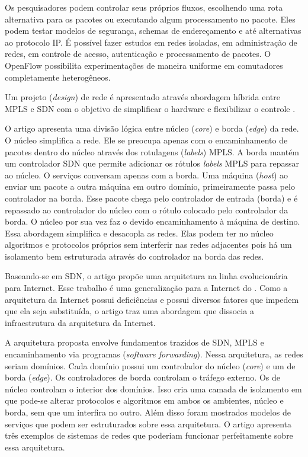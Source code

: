 Os pesquisadores podem controlar seus próprios fluxos, escolhendo uma rota
alternativa para os pacotes ou executando algum processamento no pacote.
Eles podem testar modelos de segurança, schemas de endereçamento e até
alternativas ao protocolo IP.
É possível fazer estudos em redes isoladas, em administração de redes,
em controle de acesso, autenticação e processamento de pacotes.
O OpenFlow possibilita experimentações de maneira uniforme em comutadores
completamente heterogêneos.

Um projeto (\emph{design}) de rede é apresentado através abordagem híbrida
entre MPLS e SDN com o objetivo de simplificar o hardware e flexibilizar
o controle \citep{fabric2012martin}.

O artigo apresenta uma divisão lógica entre núcleo (\emph{core}) e
borda (\emph{edge}) da rede.
O núcleo simplifica a rede.
Ele se preocupa apenas com o encaminhamento de pacotes dentro do núcleo
através dos rotulagens (\emph{labels}) MPLS.
A borda mantém um controlador SDN que permite adicionar os rótulos
\emph{labels} MPLS para repassar ao núcleo.
O serviços conversam apenas com a borda.
Uma máquina (\emph{host}) ao enviar um pacote a outra máquina em outro domínio,
primeiramente passa pelo controlador na borda.
Esse pacote chega pelo controlador de entrada (borda) e é repassado ao
controlador do núcleo com o rótulo colocado pelo controlador da borda.
O núcleo por sua vez faz o devido encaminhamento à máquina de destino.
Essa abordagem simplifica e desacopla as redes.
Elas podem ter no núcleo algoritmos e protocolos próprios sem interferir nas
redes adjacentes pois há um isolamento bem estruturada através do controlador
na borda das redes.

Baseando-se em SDN, o artigo \citep{barath2012software} propõe uma arquitetura
na linha evolucionária para Internet.
Esse trabalho é uma generalização para a Internet do \citep{fabric2012martin}.
Como a arquitetura da Internet possui deficiências e possui diversos fatores
que impedem que ela seja substituída, o artigo traz uma abordagem que dissocia
a infraestrutura da arquitetura da Internet.

A arquitetura proposta envolve fundamentos trazidos de SDN, MPLS e
encaminhamento via programas (\emph{software forwarding}).
Nessa arquitetura, as redes seriam domínios.
Cada domínio possui um controlador do núcleo (\emph{core}) e um
de borda (\emph{edge}).
Os controladores de borda controlam o tráfego externo.
Os de núcleo controlam o interior dos domínios.
Isso cria uma camada de isolamento em que pode-se alterar protocolos e
algoritmos em ambos os ambientes, núcleo e borda, sem que um interfira
no outro.
Além disso foram mostrados modelos de serviços que podem ser estruturados
sobre essa arquitetura.
O artigo apresenta três exemplos de sistemas de redes que poderiam funcionar
perfeitamente sobre essa arquitetura.

